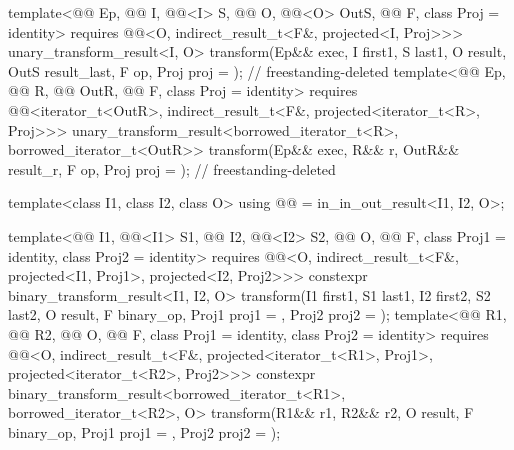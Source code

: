 \begin{codeblock}
{{    template<@@ Ep, @@ I, @@<I> S,
             @@ O, @@<O> OutS,
             @@ F, class Proj = identity>
      requires @@<O, indirect_result_t<F&, projected<I, Proj>>>
      unary_transform_result<I, O>
        transform(Ep&& exec, I first1, S last1, O result, OutS result_last,
                  F op, Proj proj = {});                                    // freestanding-deleted
    template<@@ Ep, @@ R, @@ OutR,
             @@ F, class Proj = identity>
      requires @@<iterator_t<OutR>,
                                   indirect_result_t<F&, projected<iterator_t<R>, Proj>>>
      unary_transform_result<borrowed_iterator_t<R>, borrowed_iterator_t<OutR>>
        transform(Ep&& exec, R&& r, OutR&& result_r, F op, Proj proj = {}); // freestanding-deleted

    template<class I1, class I2, class O>
      using @@ = in_in_out_result<I1, I2, O>;

    template<@@ I1, @@<I1> S1, @@ I2, @@<I2> S2,
             @@ O, @@ F, class Proj1 = identity,
             class Proj2 = identity>
      requires @@<O, indirect_result_t<F&, projected<I1, Proj1>,
                                   projected<I2, Proj2>>>
      constexpr binary_transform_result<I1, I2, O>
        transform(I1 first1, S1 last1, I2 first2, S2 last2, O result,
                  F binary_op, Proj1 proj1 = {}, Proj2 proj2 = {});
    template<@@ R1, @@ R2, @@ O,
             @@ F, class Proj1 = identity, class Proj2 = identity>
      requires @@<O, indirect_result_t<F&, projected<iterator_t<R1>, Proj1>,
                                   projected<iterator_t<R2>, Proj2>>>
      constexpr binary_transform_result<borrowed_iterator_t<R1>, borrowed_iterator_t<R2>, O>
        transform(R1&& r1, R2&& r2, O result,
                  F binary_op, Proj1 proj1 = {}, Proj2 proj2 = {});

}}
\end{codeblock}
